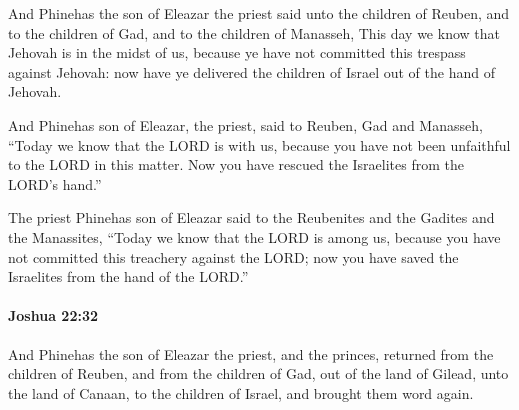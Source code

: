 			\begin{versebox}
					\item[BHS] 
					\item[ASV] And Phinehas the son of Eleazar the priest said unto the children of Reuben, and to the children of Gad, and to the children of Manasseh, This day we know that Jehovah is in the midst of us, because ye have not committed this trespass against Jehovah: now have ye delivered the children of Israel out of the hand of Jehovah.
					\item[NIV] And Phinehas son of Eleazar, the priest, said to Reuben, Gad and Manasseh, “Today we know that the LORD is with us, because you have not been unfaithful to the LORD in this matter. Now you have rescued the Israelites from the LORD’s hand.”
					\item[NRSV] The priest Phinehas son of Eleazar said to the Reubenites and the Gadites and the Manassites, “Today we know that the LORD is among us, because you have not committed this treachery against the LORD; now you have saved the Israelites from the hand of the LORD.”
			\end{versebox}

		\paragraph{Joshua 22:32} %
			\label{JOSHUA-22-32}

			And Phinehas the son of Eleazar the priest, and the princes, returned from the children of Reuben, and from the children of Gad, out of the land of Gilead, unto the land of Canaan, to the children of Israel, and brought them word again.

